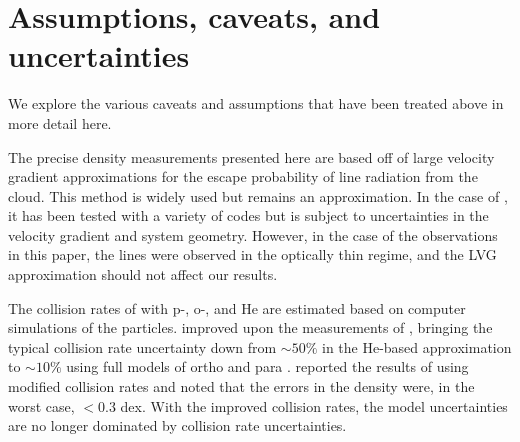 % 
% 
% 

\appendix
\section{Assumptions, caveats, and uncertainties}
\label{sec:caveats}
We explore the various caveats and assumptions that have been treated above in
more detail here.

The precise density measurements presented here are based off of large velocity
gradient approximations \citep{Sobolev1957a} for the escape probability of line
radiation from the cloud.  This method is widely used but remains an
approximation.  In the case of \formaldehyde, it has been tested with a variety
of codes \citep{van-der-Tak2007a,Henkel1983a} but is subject to uncertainties in
the velocity gradient and system geometry.  However, in the case of the
observations in this paper, the lines were observed in the optically thin regime, and the
LVG approximation should not affect our results.

The collision rates of \formaldehyde with p-\hh, o-\hh, and He are estimated
based on computer simulations of the particles.  \citet{Troscompt2009a}
improved upon the measurements of \citet{Green1991a}, bringing the typical
collision rate uncertainty down from $\sim50\%$ in the He-based approximation
to $\sim10\%$ using full models of ortho and para \hh.  \citet{Zeiger2010a}
reported the results of using modified collision rates and noted that the
errors in the \hh density were, in the worst case, $<0.3$ dex.  With the
improved \citet{Troscompt2009a} collision rates, the model uncertainties are no
longer dominated by collision rate uncertainties.

